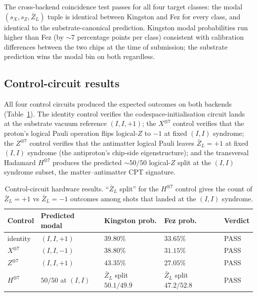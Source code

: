 \documentclass[11pt]{article}
\newcommand{\barZ}{\bar Z_L}
\begin{document}
The cross-backend coincidence test passes for all four target classes: the modal $(s_X, s_Z, \barZ)$ tuple is identical between Kingston and Fez for every class, and identical to the substrate-canonical prediction.  Kingston modal probabilities run higher than Fez (by $\sim 7$ percentage points per class) consistent with calibration differences between the two chips at the time of submission; the substrate prediction wins the modal bin on both regardless.

\subsection{Control-circuit results}
\label{sec:control-results}

All four control circuits produced the expected outcomes on both backends (Table~\ref{tab:phase2-controls}).  The identity control verifies the codespace-initialisation circuit lands at the substrate vacuum reference $(I, I, +1)$; the $X^{\otimes 7}$ control verifies that the proton's logical Pauli operation flips logical-$Z$ to $-1$ at fixed $(I, I)$ syndrome; the $Z^{\otimes 7}$ control verifies that the antimatter logical Pauli leaves $\barZ = +1$ at fixed $(I, I)$ syndrome (the antiproton's chip-side eigenstructure); and the transversal Hadamard $H^{\otimes 7}$ produces the predicted $\sim 50/50$ logical-$Z$ split at the $(I, I)$ syndrome subset, the matter--antimatter CPT signature.

\begin{table}[H]
\centering
\caption{Control-circuit hardware results.  ``$\barZ$ split'' for the $H^{\otimes 7}$ control gives the count of $\barZ = +1$ vs $\barZ = -1$ outcomes among shots that landed at the $(I, I)$ syndrome.}
\label{tab:phase2-controls}
\begin{tabular}{lllll}
\toprule
Control & Predicted modal & Kingston prob. & Fez prob. & Verdict \\
\midrule
identity      & $(I, I, +1)$        & $39.80\%$ & $33.65\%$ & PASS \\
$X^{\otimes 7}$ & $(I, I, -1)$      & $38.80\%$ & $31.15\%$ & PASS \\
$Z^{\otimes 7}$ & $(I, I, +1)$      & $43.35\%$ & $27.05\%$ & PASS \\
$H^{\otimes 7}$ & $50/50$ at $(I, I)$ & $\barZ$ split $50.1/49.9$ & $\barZ$ split $47.2/52.8$ & PASS \\
\bottomrule
\end{tabular}
\end{table}
\end{document}
